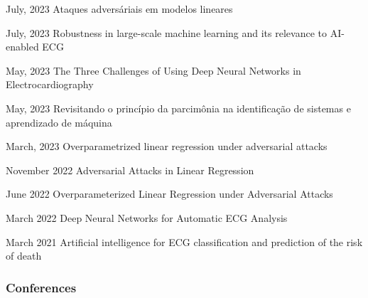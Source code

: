 \documentclass[10pt,letterpaper]{article} %
\begin{document}
    
    { July, 2023 }
    { Ataques adversáriais em modelos lineares  }
    { }{}
    

    
    { July, 2023 }
    { Robustness in large-scale machine learning and its relevance to AI-enabled ECG  }
    { }{}
    

    
    { May, 2023 }
    { The Three Challenges of Using Deep Neural Networks in Electrocardiography  }
    { }{}
    

    
    { May, 2023 }
    { Revisitando o princípio da parcimônia na identificação de sistemas e aprendizado de máquina  }
    { }{}
    

    
    { March, 2023 }
    { Overparametrized linear regression under adversarial attacks  }
    { }{}
    

    
    { November 2022 }
    { Adversarial Attacks in Linear Regression  }
    { }{}
    

    
    { June 2022 }
    { Overparameterized Linear Regression under Adversarial Attacks  }
    { }{}
    

    
    { March 2022 }
    { Deep Neural Networks for Automatic ECG Analysis  }
    { }{}
    

    
    { March 2021 }
    { Artificial intelligence for ECG classification and prediction of the risk of death  }
    { }{}
    


\subsubsection*{Conferences}
\end{document}
